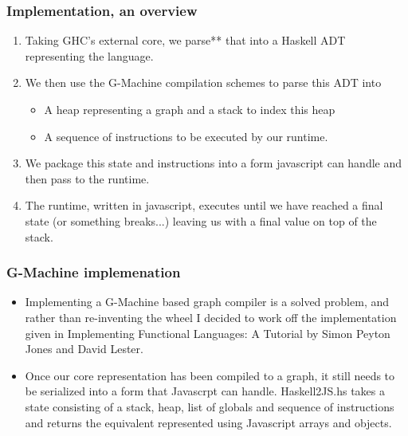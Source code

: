 \documentclass{beamer}
\begin{document}
\begin{frame}
	\frametitle{Implementation, an overview}
	\begin{enumerate}
	\item Taking GHC's external core, we parse** that into a
	Haskell ADT representing the language. 
	\item We then use the G-Machine compilation schemes to 
	parse this ADT into 
		\begin{itemize}
			\item A heap representing a graph and a stack
			to index this heap
			\item A sequence of instructions to be executed 
			by our runtime.
		\end{itemize}
	\item We package this state and instructions into a 
	form javascript can handle and then pass to the runtime.
	\item The runtime, written in javascript, executes until
	we have reached a final state (or something breaks...) 
	leaving us with a final value on top of the stack.
	\end{enumerate}
\end{frame}

\begin{frame}
	\frametitle{G-Machine implemenation}
	\begin{itemize}
	\item Implementing a G-Machine based graph compiler is 
	a solved
	problem, and rather than re-inventing the wheel I decided
	to work off the implementation given in Implementing 
	Functional Languages: A Tutorial by Simon Peyton Jones
	and David Lester. 
	\item Once our core representation has been compiled to
	a graph, it still needs to be serialized into a form that
	Javascrpt can handle. Haskell2JS.hs takes a state consisting
	of a stack, heap, list of globals and sequence of
	instructions and returns the equivalent represented
	using Javascript arrays and objects.
	\end{itemize}
	
\end{frame}
\end{document}
